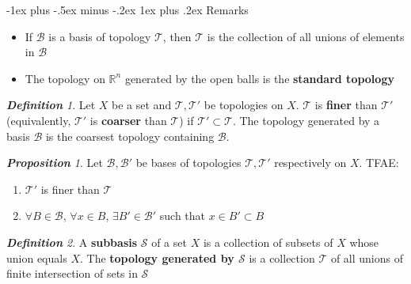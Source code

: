 \documentclass[frenchspacing,9pt,landscape,a4paper]{article}
\makeatletter
\renewcommand{\subsubsection}{\@startsection{subsubsection}{3}{0mm}%
                                {-1ex plus -.5ex minus -.2ex}%
                                {1ex plus .2ex}%
                                {\normalfont\small\bfseries}}
\newcommand{\BR}{\mathbb R}
\theoremstyle{remark}
\newtheorem*{defn}{\textbf{Definition}}
\newtheorem*{prop}{\textbf{Proposition}}
\makeatother
\begin{document}
\begin{multicols}{4}
\subsubsection{Remarks}
\begin{itemize}
    \item If $\mathcal{B}$ is a basis of topology  $\mathcal{T}$, then  $\mathcal{T}$ is the collection of
        all unions of elements in  $\mathcal{B}$
    \item The topology on  $\BR^n$ generated by the open balls is the \textbf{standard topology}
\end{itemize}
\begin{defn}
    Let $X$ be a set and  $\mathcal{T},\mathcal{T}'$ be topologies on  $X$.  $\mathcal{T}$ is
    \textbf{finer} than  $\mathcal{T}'$ (equivalently,  $\mathcal{T}'$ is \textbf{coarser} than
    $\mathcal{T}$) if  $\mathcal{T}'\subset\mathcal{T}$. The topology generated by a basis $\mathcal{B}$ is
    the coarsest topology containing  $\mathcal{B}$.
\end{defn}
\begin{prop}
    Let $\mathcal{B},\mathcal{B}'$ be bases of topologies  $\mathcal{T},\mathcal{T}'$ respectively on  $X$.
    TFAE:
     \begin{enumerate}
         \item $\mathcal{T}'$ is finer than  $\mathcal{T}$
         \item  $\forall B\in\mathcal{B}$,  $\forall x\in B$,  $\exists B'\in\mathcal{B}'$ such that  $x\in
             B'\subset B$
    \end{enumerate}
\end{prop}
\begin{defn}
    A \textbf{subbasis} $\mathcal{S}$ of a set  $X$ is a collection of subsets of  $X$ whose union equals
    $X$. The \textbf{topology generated by $\mathcal{S}$} is a collection $\mathcal{T}$ of all unions of
    finite intersection of sets in  $\mathcal{S}$
\end{defn}

\end{multicols}
\end{document}

